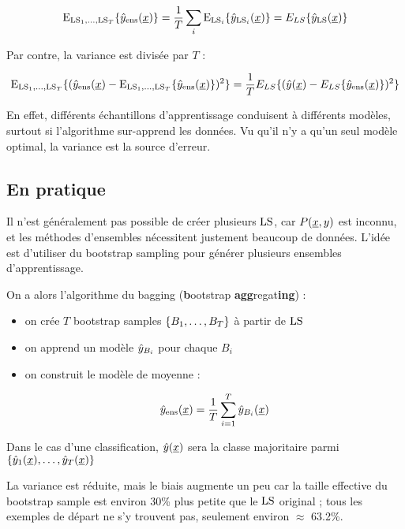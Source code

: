 	$$\text{E}_{\text{LS}_1, \dots , \text{LS}_T} \lbrace \hat{y}_{\text{ens}} (\underline{x}) \rbrace = \frac{1}{T} \sum_i \text{E}_{\text{LS}_i}\lbrace \hat{y}_{\text{LS}_i}(\underline{x}) \rbrace = E_{LS}\{\hat{y}_{\text{LS}}(\underline{x})\}$$
	
	Par contre, la variance est divisée par $T$ :
	
	$$\text{E}_{\text{LS}_1, \dots , \text{LS}_T} \lbrace (\hat{y}_{\text{ens}}(\underline{x}) - \text{E}_{\text{LS}_1, \dots , \text{LS}_T} \lbrace \hat{y}_{\text{ens}}(\underline{x}) \rbrace)^2 \rbrace = \frac{1}{T} E_{LS}\{(\hat{y}(\underline{x}) - E_{LS}\{\hat{y}_{\text{ens}}(\underline{x})\})^2\}$$
	
	En effet, différents échantillons d'apprentissage conduisent à différents modèles, surtout si l'algorithme sur-apprend les données. Vu qu'il n'y a qu'un seul modèle optimal, la variance est la source d'erreur.
	
	
	\subsection{En pratique}
	
	Il n'est généralement pas possible de créer plusieurs $\text{LS}$, car $P(\underline{x}, y)$ est inconnu, et les méthodes d'ensembles nécessitent justement beaucoup de données. L'idée est d'utiliser du bootstrap sampling pour générer plusieurs ensembles d'apprentissage.

	
	On a alors l'algorithme du bagging (\textbf{b}ootstrap \textbf{agg}regat\textbf{ing}) :
	
	\begin{itemize}
		\item on crée $T$ bootstrap samples $\lbrace B_1, \dots , B_T \rbrace$ à partir de $\text{LS}$
		\item on apprend un modèle $\hat{y}_{B_i}$ pour chaque $B_i$
		\item on construit le modèle de moyenne :
		
		$$\hat{y}_{\text{ens}}(\underline{x}) = \frac{1}{T} \sum_{i = 1}^T \hat{y}_{B_i}(\underline{x})$$
	\end{itemize}
	
	
	Dans le cas d'une classification, $\hat{y}(\underline{x})$ sera la classe majoritaire parmi $\lbrace \hat{y}_1(\underline{x}), \dots , \hat{y}_T(\underline{x}) \rbrace$

	
	La variance est réduite, mais le biais augmente un peu car la taille effective du bootstrap sample est environ 30\% plus petite que le $\text{LS}$ original ; tous les exemples de départ ne s'y trouvent pas, seulement environ $\approx$ 63.2\%.
	
	
